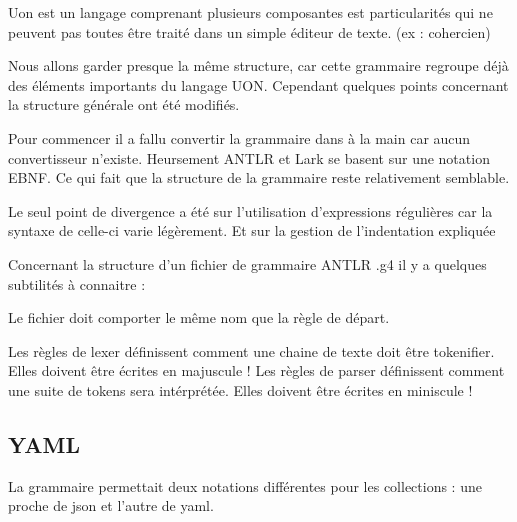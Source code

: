 \documentclass[
    iict, %
    il, %
]{heig-tb}
\begin{document}
Uon est un langage comprenant plusieurs composantes est particularités qui ne peuvent pas toutes être traité dans un simple éditeur de texte. (ex : cohercien)
%

Nous allons garder presque la même structure, car cette grammaire regroupe déjà des éléments importants du langage UON.
Cependant quelques points concernant la structure générale ont été modifiés.

Pour commencer il a fallu convertir la grammaire dans à la main car aucun convertisseur n’existe. Heursement ANTLR et Lark se basent sur une notation EBNF.
Ce qui fait que la structure de la grammaire reste relativement semblable.

Le seul point de divergence a été sur l'utilisation d'expressions régulières car la syntaxe de celle-ci varie légèrement. Et sur la gestion de l'indentation expliquée %

Concernant la structure d'un fichier de grammaire ANTLR .g4 il y a quelques subtilités à connaitre :

Le fichier doit comporter le même nom que la règle de départ. %

Les règles de lexer définissent comment une chaine de texte doit être tokenifier. Elles doivent être écrites en majuscule !
Les règles de parser définissent comment une suite de tokens sera intérprétée. Elles doivent être écrites en miniscule !







\subsection{YAML}
La grammaire permettait deux notations différentes pour les collections : une proche de json et l'autre de yaml.

\end{document}

